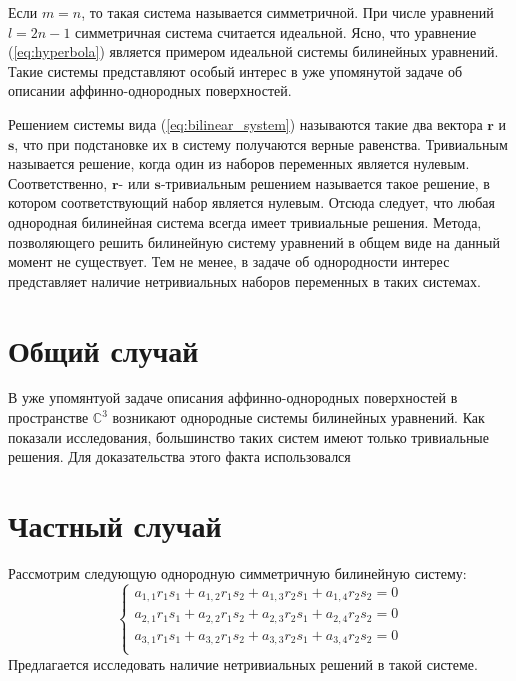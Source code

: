Если $m = n$, то такая система называется симметричной. При числе уравнений $l = 2n - 1$ симметричная 
система считается идеальной. Ясно, что уравнение (\ref{eq:hyperbola}) является примером идеальной системы 
билинейных уравнений. Такие системы представляют особый интерес в уже упомянутой задаче об описании 
аффинно-однородных поверхностей. 

Решением системы вида (\ref{eq:bilinear_system}) называются такие два вектора $\mathbf{r}$ и $
\mathbf{s}$, что при подстановке их в систему получаются верные равенства. Тривиальным называется 
решение, когда один из наборов переменных является нулевым. Соответственно, $\mathbf{r}$- или $
\mathbf{s}$-тривиальным решением называется такое решение, в котором соответствующий набор является 
нулевым. Отсюда следует, что любая однородная билинейная система всегда имеет тривиальные решения. 
Метода, позволяющего решить билинейную систему уравнений в общем виде на данный момент не существует. 
Тем не менее, в задаче об однородности интерес представляет наличие нетривиальных наборов переменных 
в таких системах. 

\section{Общий случай} 

В уже упомянтуой задаче описания аффинно-однородных поверхностей в пространстве $ \mathbb{C}^3 $ 
возникают однородные системы билинейных уравнений. Как показали исследования, большинство таких 
систем имеют только тривиальные решения. Для доказательства этого факта использовался 


\section{Частный случай}

Рассмотрим следующую однородную симметричную билинейную систему: 
\begin{equation}\label{eq:trivial}
	\begin{cases}
		a_{1,1} r_1 s_1 + a_{1,2} r_1 s_2 + a_{1,3} r_2 s_1 + a_{1,4} r_2 s_2 = 0 \\
		a_{2,1} r_1 s_1 + a_{2,2} r_1 s_2 + a_{2,3} r_2 s_1 + a_{2,4} r_2 s_2 = 0 \\
		a_{3,1} r_1 s_1 + a_{3,2} r_1 s_2 + a_{3,3} r_2 s_1 + a_{3,4} r_2 s_2 = 0 \\
	\end{cases}
\end{equation}
Предлагается исследовать наличие нетривиальных решений в такой системе.

